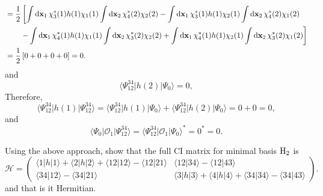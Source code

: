 \documentclass[a4paper]{book}
\newcommand*{\dif}{\mathop{}\!\mathrm{d}}
\newcommand{\bfx}{{\bf x}}
\begin{document}
\begin{solution}
\begin{align*}
		&= \frac{1}{2} \left[ \int \dif \bfx_1 \, \chi_3^*(1) h(1) \chi_1(1) \int \dif \bfx_2 \, \chi^*_4(2) \chi_2(2) - \int \dif \bfx_1 \, \chi_3^*(1) h(1) \chi_2(1) \int \dif \bfx_2 \, \chi^*_4(2) \chi_1(2) \right. \\
		&\hspace{2em} \left. - \int \dif \bfx_1 \, \chi_4^*(1) h(1) \chi_1(1) \int \dif \bfx_2 \, \chi^*_3(2) \chi_2(2) + \int \dif \bfx_1 \, \chi_4^*(1) h(1) \chi_2(1) \int \dif \bfx_2 \, \chi^*_3(2) \chi_1(2) \right] \\
		&= \frac{1}{2} \left[ 0 + 0 + 0 + 0 \right] = 0.
	\end{align*}
	and
	\[
		\langle \Psi_{12}^{34} | h(2) | \Psi_0 \rangle = 0,
	\]
	Therefore,
	\begin{equation}
		\langle \Psi_{12}^{34} | h(1) | \Psi_{12}^{34} \rangle = \langle \Psi_{12}^{34} | h(1) | \Psi_0 \rangle + \langle \Psi_{12}^{34} | h(2) | \Psi_0 \rangle = 0 + 0 = 0,
	\end{equation}
	and
	\begin{equation}
		\langle \Psi_0 | \mathscr{O}_1 | \Psi^{34}_{12} \rangle = \langle \Psi^{34}_{12} | \mathscr{O}_1 | \Psi_0 \rangle^* = 0^* = 0.
	\end{equation}
	\end{solution}
	
	\begin{exercise}
	Using the above approach, show that the full CI matrix for minimal basis $\ce{H2}$ is
	\[
		\mathscr{H} = \begin{pmatrix}
			\langle 1 | h | 1 \rangle + \langle 2 | h | 2 \rangle + \langle 12 | 12 \rangle - \langle 12 | 21 \rangle & \langle 12 | 34 \rangle - \langle 12 | 43 \rangle \\
			\langle 34 | 12 \rangle - \langle 34 | 21 \rangle & \langle 3 | h | 3 \rangle + \langle 4 | h | 4 \rangle + \langle 34| 34 \rangle - \langle 34 | 43 \rangle
		\end{pmatrix}.
	\]
	and that is it Hermitian.
	\end{exercise}
	
\end{document}
